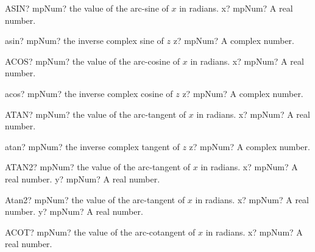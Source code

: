 \documentclass[12pt,a4paper,openany]{book}
\begin{document}
\begin{mpFunctionsExtract}
\mpWorksheetFunctionOneNotImplemented
{ASIN? mpNum? the value of the arc-sine of $x$ in radians.}
{x? mpNum? A real number.}
\end{mpFunctionsExtract}

\begin{mpFunctionsExtract}
\mpFunctionOne
{asin? mpNum? the inverse complex sine of $z$}
{z? mpNum? A complex number.}
\end{mpFunctionsExtract}

\begin{mpFunctionsExtract}
\mpWorksheetFunctionOneNotImplemented
{ACOS? mpNum? the value of the arc-cosine of $x$ in radians.}
{x? mpNum? A real number.}
\end{mpFunctionsExtract}

\begin{mpFunctionsExtract}
\mpFunctionOne
{acos? mpNum? the inverse complex cosine of $z$}
{z? mpNum? A complex number.}
\end{mpFunctionsExtract}

\begin{mpFunctionsExtract}
\mpWorksheetFunctionOneNotImplemented
{ATAN? mpNum? the value of the arc-tangent of $x$ in radians.}
{x? mpNum? A real number.}
\end{mpFunctionsExtract}

\begin{mpFunctionsExtract}
\mpFunctionOne
{atan? mpNum? the inverse complex tangent of $z$}
{z? mpNum? A complex number.}
\end{mpFunctionsExtract}

\begin{mpFunctionsExtract}
\mpWorksheetFunctionTwoNotImplemented
{ATAN2? mpNum? the value of the arc-tangent of $x$ in radians.}
{x? mpNum? A real number.}
{y? mpNum? A real number.}
\end{mpFunctionsExtract}

\begin{mpFunctionsExtract}
\mpFunctionTwo
{Atan2? mpNum? the value of the arc-tangent of $x$ in radians.}
{x? mpNum? A real number.}
{y? mpNum? A real number.}
\end{mpFunctionsExtract}

\begin{mpFunctionsExtract}
\mpWorksheetFunctionOneNotImplemented
{ACOT? mpNum? the value of the arc-cotangent of $x$ in radians.}
{x? mpNum? A real number.}
\end{mpFunctionsExtract}
\end{document}
